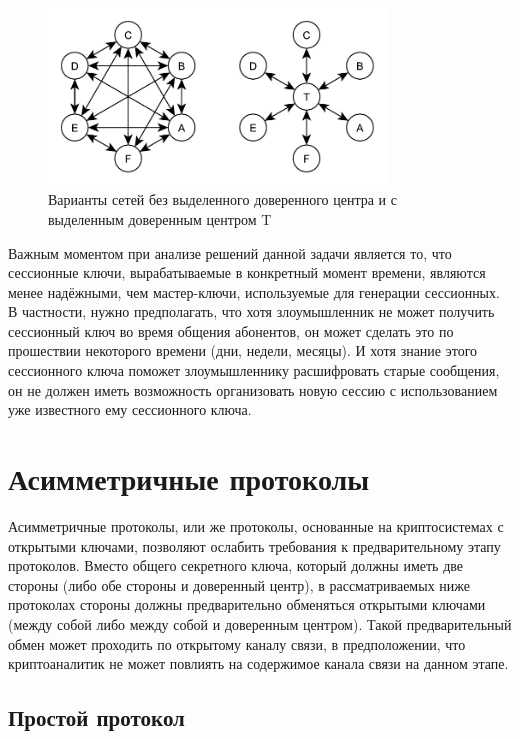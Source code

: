 \begin{figure}[!htb]
    \centering
    \includegraphics[width=0.8\textwidth]{pic/key_distribution-networks}
    \caption{Варианты сетей без выделенного доверенного центра и с выделенным доверенным центром T\label{fig:key_distribution-networks}}
\end{figure}

Важным моментом при анализе решений данной задачи является то, что сессионные ключи, вырабатываемые в конкретный момент времени, являются менее надёжными, чем мастер-ключи, используемые для генерации сессионных. В частности, нужно предполагать, что хотя злоумышленник не может получить сессионный ключ во время общения абонентов, он может сделать это по прошествии некоторого времени (дни, недели, месяцы). И хотя знание этого сессионного ключа поможет злоумышленнику расшифровать старые сообщения, он не должен иметь возможность организовать новую сессию с использованием уже известного ему сессионного ключа.





\section{Асимметричные протоколы}

Асимметричные протоколы, или же протоколы, основанные на криптосистемах с открытыми ключами, позволяют ослабить требования к предварительному этапу протоколов. Вместо общего секретного ключа, который должны иметь две стороны (либо обе стороны и доверенный центр), в рассматриваемых ниже протоколах стороны должны предварительно обменяться открытыми ключами (между собой либо между собой и доверенным центром). Такой предварительный обмен может проходить по открытому каналу связи, в предположении, что криптоаналитик не может повлиять на содержимое канала связи на данном этапе.

\subsection{Простой протокол}


